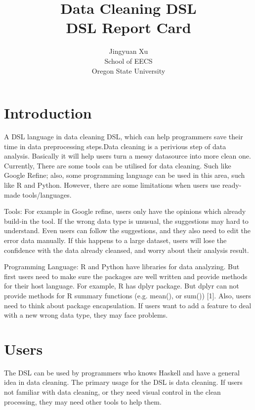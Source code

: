 \documentclass[11pt]{article}
\begin{document}
\title{\textbf{Data Cleaning DSL }
\\ DSL Report Card}

\author{Jingyuan Xu \\
School of EECS \\ 
Oregon State University
}

\maketitle


\section{Introduction}
\label{sec:intro}
%
A DSL language in data cleaning DSL, which can help programmers save their time in data preprocessing steps.Data cleaning is a perivious step of data analysis. Basically it will help users turn a messy datasource into more clean one. Currently, There are some tools can be utilised for data cleaning. Such like Google Refine; also, some programming language can be used in this area, such like R and Python. However, there are some limitations when users use ready- made tools/languages. 

Tools: For example in Google refine, users only have the opinions which already build-in the tool. If the wrong data type is unusual, the suggestions may hard to understand. Even users can follow the suggestions, and they also need to edit the error data manually. If this happens to a large dataset, users will lose the confidence with the data already cleansed, and worry about their analysis result. 

Programming Language: R and Python have libraries for data analyzing. But first users need to make sure the packages are well written and provide methods for their host language. For example,  R has dplyr package. But dplyr can not provide methods for R summary functions (e.g. mean(), or sum()) [1]. Also, users need to think about package encapsulation. If users want to add a  feature to deal with a new wrong data type,  they may face problems. \\

\section{Users}
\label{sec:users}

The DSL can be used by programmers who knows Haskell and have a general idea in data cleaning. The primary usage for the DSL is data cleaning. If users not familiar with data cleaning, or they need visual control in the clean processing, they may need other tools to help them.\\
\end{document}
